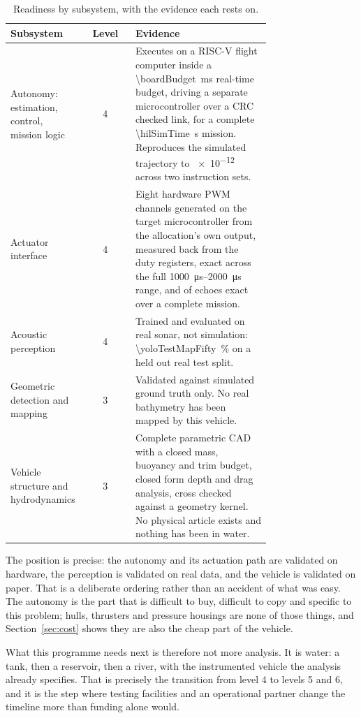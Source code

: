 \documentclass[10pt,a4paper]{article}
\begin{document}
\begin{table}[htbp]\centering\small
\caption{Readiness by subsystem, with the evidence each rests on.}
\begin{tabular}{p{0.22\linewidth}c p{0.52\linewidth}}
\toprule
\textbf{Subsystem} & \textbf{Level} & \textbf{Evidence} \\
\midrule
Autonomy: estimation, control, mission logic & 4 &
Executes on a RISC-V flight computer inside a
\SI{\boardBudget}{\milli\second} real-time budget, driving a separate
microcontroller over a CRC checked link, for a complete
\SI{\hilSimTime}{\second} mission. Reproduces the simulated trajectory to
\num{e-12} across two instruction sets. \\
Actuator interface & 4 &
Eight hardware PWM channels generated on the target microcontroller from the
allocation's own output, measured back from the duty registers, exact across
the full \SIrange{1000}{2000}{\micro\second} range, and \espMatched{} of
\espEchoes{} echoes exact over a complete mission. \\
Acoustic perception & 4 &
Trained and evaluated on real sonar, not simulation: \SI{\yoloTestMapFifty}{\percent}
on a held out real test split. \\
Geometric detection and mapping & 3 &
Validated against simulated ground truth only. No real bathymetry has been
mapped by this vehicle. \\
Vehicle structure and hydrodynamics & 3 &
Complete parametric CAD with a closed mass, buoyancy and trim budget, closed
form depth and drag analysis, cross checked against a geometry kernel. No
physical article exists and nothing has been in water. \\
\bottomrule
\end{tabular}
\end{table}

The position is precise: the autonomy and its actuation path are validated
on hardware, the perception is validated on real data, and the vehicle is
validated on paper. That is a deliberate ordering rather than an accident of
what was easy. The autonomy is the part that is difficult to buy, difficult to
copy and specific to this problem; hulls, thrusters and pressure housings are
none of those things, and Section~\ref{sec:cost} shows they are also the cheap
part of the vehicle.

What this programme needs next is therefore not more analysis. It is water: a
tank, then a reservoir, then a river, with the instrumented vehicle the
analysis already specifies. That is precisely the transition from level 4 to
levels 5 and 6, and it is the step where testing facilities and an operational
partner change the timeline more than funding alone would.
\end{document}
